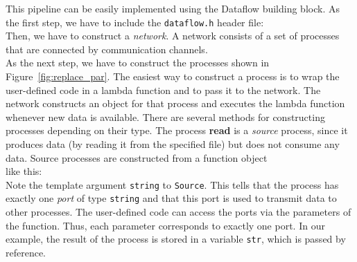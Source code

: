 This pipeline can be easily implemented using the Dataflow building block. As the first step, we have to include the \lstinline|dataflow.h| header file:
%
\\
%
Then, we have to construct a \emph{network}. A network consists of a set of processes that are connected by communication channels.
%
\\
%
As the next step, we have to construct the processes shown in Figure~\ref{fig:replace_par}. The easiest way to construct a process is to wrap the user-defined code in a lambda function and to pass it to the network. The network constructs an object for that process and executes the lambda function whenever new data is available. There are several methods for constructing processes depending on their type. The process \textbf{read} is a \emph{source} process, since it produces data (by reading it from the specified file) but does not consume any data. Source processes are constructed from a function object
%
\\
%
like this:
%
\\
%
Note the template argument \lstinline|string| to \lstinline|Source|. This tells \embb that the process has exactly one \emph{port} of type \lstinline|string| and that this port is used to transmit data to other processes. The user-defined code can access the ports via the parameters of the function. Thus, each parameter corresponds to exactly one port. In our example, the result of the process is stored in a variable \lstinline|str|, which is passed by reference.

